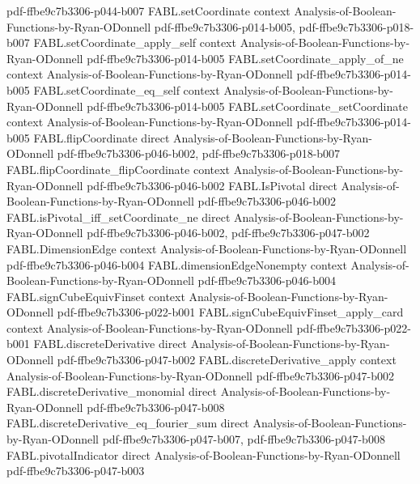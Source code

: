\begin{theorem}
  {pdf-ffbe9c7b3306-p044-b007}
\proofstep
  {FABL.setCoordinate}
  {context}
  {Analysis-of-Boolean-Functions-by-Ryan-ODonnell}
  {pdf-ffbe9c7b3306-p014-b005,
    pdf-ffbe9c7b3306-p018-b007}
\proofstep
  {FABL.setCoordinate_apply_self}
  {context}
  {Analysis-of-Boolean-Functions-by-Ryan-ODonnell}
  {pdf-ffbe9c7b3306-p014-b005}
\proofstep
  {FABL.setCoordinate_apply_of_ne}
  {context}
  {Analysis-of-Boolean-Functions-by-Ryan-ODonnell}
  {pdf-ffbe9c7b3306-p014-b005}
\proofstep
  {FABL.setCoordinate_eq_self}
  {context}
  {Analysis-of-Boolean-Functions-by-Ryan-ODonnell}
  {pdf-ffbe9c7b3306-p014-b005}
\proofstep
  {FABL.setCoordinate_setCoordinate}
  {context}
  {Analysis-of-Boolean-Functions-by-Ryan-ODonnell}
  {pdf-ffbe9c7b3306-p014-b005}
\proofstep
  {FABL.flipCoordinate}
  {direct}
  {Analysis-of-Boolean-Functions-by-Ryan-ODonnell}
  {pdf-ffbe9c7b3306-p046-b002,
    pdf-ffbe9c7b3306-p018-b007}
\proofstep
  {FABL.flipCoordinate_flipCoordinate}
  {context}
  {Analysis-of-Boolean-Functions-by-Ryan-ODonnell}
  {pdf-ffbe9c7b3306-p046-b002}
\proofstep
  {FABL.IsPivotal}
  {direct}
  {Analysis-of-Boolean-Functions-by-Ryan-ODonnell}
  {pdf-ffbe9c7b3306-p046-b002}
\proofstep
  {FABL.isPivotal_iff_setCoordinate_ne}
  {direct}
  {Analysis-of-Boolean-Functions-by-Ryan-ODonnell}
  {pdf-ffbe9c7b3306-p046-b002,
    pdf-ffbe9c7b3306-p047-b002}
\proofstep
  {FABL.DimensionEdge}
  {context}
  {Analysis-of-Boolean-Functions-by-Ryan-ODonnell}
  {pdf-ffbe9c7b3306-p046-b004}
\proofstep
  {FABL.dimensionEdgeNonempty}
  {context}
  {Analysis-of-Boolean-Functions-by-Ryan-ODonnell}
  {pdf-ffbe9c7b3306-p046-b004}
\proofstep
  {FABL.signCubeEquivFinset}
  {context}
  {Analysis-of-Boolean-Functions-by-Ryan-ODonnell}
  {pdf-ffbe9c7b3306-p022-b001}
\proofstep
  {FABL.signCubeEquivFinset_apply_card}
  {context}
  {Analysis-of-Boolean-Functions-by-Ryan-ODonnell}
  {pdf-ffbe9c7b3306-p022-b001}
\proofstep
  {FABL.discreteDerivative}
  {direct}
  {Analysis-of-Boolean-Functions-by-Ryan-ODonnell}
  {pdf-ffbe9c7b3306-p047-b002}
\proofstep
  {FABL.discreteDerivative_apply}
  {context}
  {Analysis-of-Boolean-Functions-by-Ryan-ODonnell}
  {pdf-ffbe9c7b3306-p047-b002}
\proofstep
  {FABL.discreteDerivative_monomial}
  {direct}
  {Analysis-of-Boolean-Functions-by-Ryan-ODonnell}
  {pdf-ffbe9c7b3306-p047-b008}
\proofstep
  {FABL.discreteDerivative_eq_fourier_sum}
  {direct}
  {Analysis-of-Boolean-Functions-by-Ryan-ODonnell}
  {pdf-ffbe9c7b3306-p047-b007,
    pdf-ffbe9c7b3306-p047-b008}
\proofstep
  {FABL.pivotalIndicator}
  {direct}
  {Analysis-of-Boolean-Functions-by-Ryan-ODonnell}
  {pdf-ffbe9c7b3306-p047-b003}

\end{theorem}
